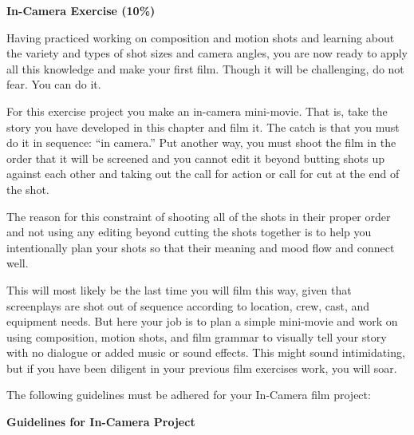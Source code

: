 \documentclass[
]{book}
\begin{document}
\begin{assessment}
\textbf{In-Camera Exercise (10\%)}

Having practiced working on composition and motion shots and learning about the variety and types of shot sizes and camera angles, you are now ready to apply all this knowledge and make your first film. Though it will be challenging, do not fear. You can do it.

For this exercise project you make an in-camera mini-movie. That is, take the story you have developed in this chapter and film it. The catch is that you must do it in sequence: ``in camera.'' Put another way, you must shoot the film in the order that it will be screened and you cannot edit it beyond butting shots up against each other and taking out the call for action or call for cut at the end of the shot.

The reason for this constraint of shooting all of the shots in their proper order and not using any editing beyond cutting the shots together is to help you intentionally plan your shots so that their meaning and mood flow and connect well.

This will most likely be the last time you will film this way, given that screenplays are shot out of sequence according to location, crew, cast, and equipment needs. But here your job is to plan a simple mini-movie and work on using composition, motion shots, and film grammar to visually tell your story with no dialogue or added music or sound effects. This might sound intimidating, but if you have been diligent in your previous film exercises work, you will soar.

The following guidelines must be adhered for your In-Camera film project:

\textbf{Guidelines for In-Camera Project}


\end{assessment}
\end{document}
